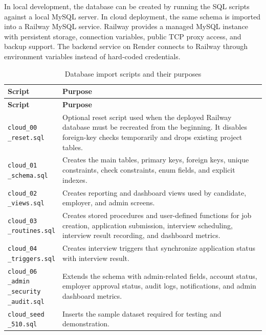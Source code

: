 \documentclass[12pt,a4paper]{report}
\makeatletter
\newcommand{\codebreak}[1]{\begin{tabular}[t]{@{}l@{}}#1\end{tabular}}
\makeatother
\begin{document}
In local development, the database can be created by running the SQL scripts against a local MySQL server. In cloud deployment, the same schema is imported into a Railway MySQL service. Railway provides a managed MySQL instance with persistent storage, connection variables, public TCP proxy access, and backup support. The backend service on Render connects to Railway through environment variables instead of hard-coded credentials.

\begin{longtable}{L{0.28\textwidth}L{0.62\textwidth}}
\caption{Database import scripts and their purposes}
\label{tab:database-scripts}\\
\toprule
\textbf{Script} & \textbf{Purpose} \\
\midrule
\endfirsthead
\toprule
\textbf{Script} & \textbf{Purpose} \\
\midrule
\endhead
\codebreak{\texttt{cloud\_00}\\\texttt{\_reset.sql}} & Optional reset script used when the deployed Railway database must be recreated from the beginning. It disables foreign-key checks temporarily and drops existing project tables. \\
\codebreak{\texttt{cloud\_01}\\\texttt{\_schema.sql}} & Creates the main tables, primary keys, foreign keys, unique constraints, check constraints, enum fields, and explicit indexes. \\
\codebreak{\texttt{cloud\_02}\\\texttt{\_views.sql}} & Creates reporting and dashboard views used by candidate, employer, and admin screens. \\
\codebreak{\texttt{cloud\_03}\\\texttt{\_routines.sql}} & Creates stored procedures and user-defined functions for job creation, application submission, interview scheduling, interview result recording, and dashboard metrics. \\
\codebreak{\texttt{cloud\_04}\\\texttt{\_triggers.sql}} & Creates interview triggers that synchronize application status with interview result. \\
\codebreak{\texttt{cloud\_06}\\\texttt{\_admin}\\\texttt{\_security}\\\texttt{\_audit.sql}} & Extends the schema with admin-related fields, account status, employer approval status, audit logs, notifications, and admin dashboard metrics. \\
\codebreak{\texttt{cloud\_seed}\\\texttt{\_510.sql}} & Inserts the sample dataset required for testing and demonstration. \\
\bottomrule
\end{longtable}
\end{document}
